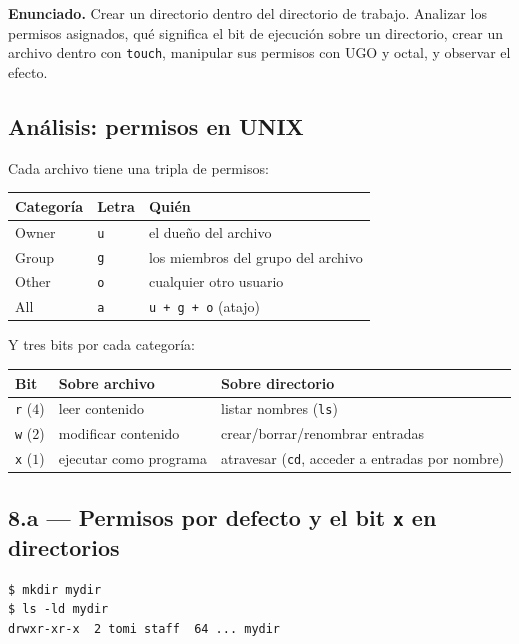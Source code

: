 \documentclass[11pt,a4paper]{article}
\begin{document}
\textbf{Enunciado.} Crear un directorio dentro del directorio de
trabajo. Analizar los permisos asignados, qué significa el bit de
ejecución sobre un directorio, crear un archivo dentro con
\texttt{touch}, manipular sus permisos con UGO y octal, y observar el
efecto.

\subsection*{Análisis: permisos en UNIX}

Cada archivo tiene una tripla de permisos:

\begin{center}
\small
\begin{tabular}{@{}lll@{}}
\toprule
Categoría & Letra & Quién \\
\midrule
Owner    & \texttt{u} & el dueño del archivo \\
Group    & \texttt{g} & los miembros del grupo del archivo \\
Other    & \texttt{o} & cualquier otro usuario \\
All      & \texttt{a} & \texttt{u + g + o} (atajo) \\
\bottomrule
\end{tabular}
\end{center}

Y tres bits por cada categoría:

\begin{center}
\small
\begin{tabular}{@{}lll@{}}
\toprule
Bit & Sobre archivo & Sobre directorio \\
\midrule
\texttt{r} ($4$) & leer contenido            & listar nombres (\texttt{ls}) \\
\texttt{w} ($2$) & modificar contenido       & crear/borrar/renombrar entradas \\
\texttt{x} ($1$) & ejecutar como programa    & atravesar (\texttt{cd}, acceder a entradas por nombre) \\
\bottomrule
\end{tabular}
\end{center}

\subsection*{8.a --- Permisos por defecto y el bit \texttt{x} en directorios}

\begin{lstlisting}[style=shellstyle]
$ mkdir mydir
$ ls -ld mydir
drwxr-xr-x  2 tomi staff  64 ... mydir
\end{lstlisting}
\end{document}
